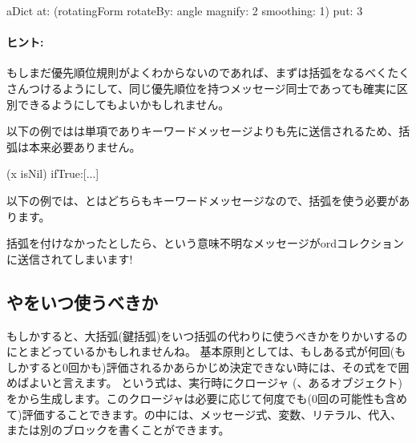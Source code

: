 \documentclass[a4paper,10pt,twoside]{book}
\begin{document}
\begin{code}{}
aDict
   at: (rotatingForm 
          rotateBy: angle	
          magnify: 2 
          smoothing: 1)
   put: 3
\end{code}



\paragraph{ヒント:} もしまだ優先順位規則がよくわからないのであれば、まずは括弧をなるべくたくさんつけるようにして、同じ優先順位を持つメッセージ同士であっても確実に区別できるようにしてもよいかもしれません。

以下の例ではは単項でありキーワードメッセージよりも先に送信されるため、括弧は本来必要ありません。
\begin{code}{}
(x isNil)
   ifTrue:[...]
\end{code}

以下の例では、とはどちらもキーワードメッセージなので、括弧を使う必要があります。
\noindent
括弧を付けなかったとしたら、という意味不明なメッセージがordコレクションに送信されてしまいます!

\subsection{\lct{[ ]}や\lct{( )}をいつ使うべきか}
もしかすると、大括弧(鍵括弧)をいつ括弧の代わりに使うべきかをりかいするのにとまどっているかもしれませんね。
基本原則としては、もしある式が何回(もしかすると0回かも)評価されるかあらかじめ決定できない時には、その式を\ct{[ ]}で囲めばよいと言えます。
という式は、実行時にクロージャ (\ie 、あるオブジェクト)をから生成します。このクロージャは必要に応じて何度でも(0回の可能性も含めて)評価することできます。\ct{[ ]}の中には、メッセージ式、変数、リテラル、代入、または別のブロックを書くことができます。
\end{document}

